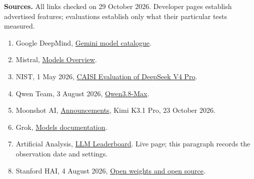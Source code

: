 \medskip\noindent
\textbf{Sources.}
All links checked on 29 October 2026.
Developer pages establish advertised
features; evaluations establish only
what their particular tests measured.

\begin{enumerate}
\item Google DeepMind,
\href{https://deepmind.google/%
models/gemini/}{Gemini model catalogue}.

\item Mistral,
\href{https://docs.mistral.ai/%
models}{Models Overview}.

\item NIST, 1 May 2026,
\href{https://www.nist.gov/%
news-events/news/2026/05/%
caisi-evaluation-deepseek-v4-pro}{%
CAISI Evaluation of DeepSeek V4 Pro}.

\item Qwen Team, 3 August 2026,
\href{https://qwen.ai/%
blog?id=qwen3.8}{Qwen3.8-Max}.

\item Moonshot AI,
\href{https://forum.moonshot.ai/%
c/announcement/5}{Announcements},
Kimi K3.1 Pro, 23 October 2026.

\item Grok,
\href{https://docs.x.ai/%
developers/models}{Models documentation}.

\item Artificial Analysis,
\href{https://artificialanalysis.ai/%
leaderboards/models}{LLM Leaderboard}.
Live page; this paragraph records
the observation date and settings.

\item Stanford HAI, 4 August 2026,
\href{https://hai.stanford.edu/news/%
open-weight-models-arent-enough-we-need-%
truly-open-source-ai-models-for-science-%
and-society}{Open weights and open source}.
\end{enumerate}


